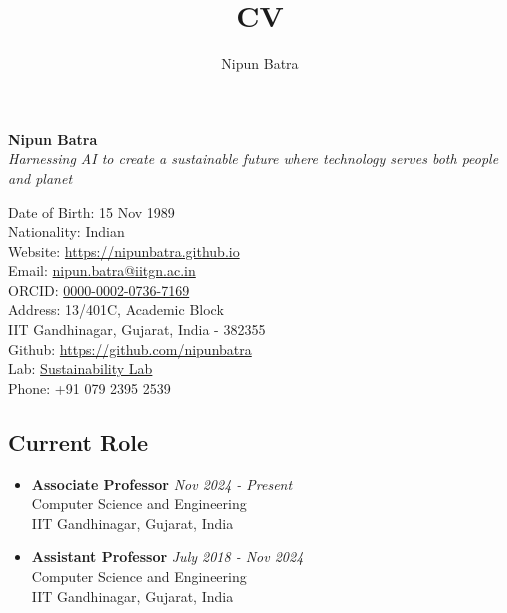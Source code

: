 \documentclass[letter,10pt]{article}
\title{CV}
\author{Nipun Batra}
\begin{document}
\setlength\itemsep{-0.5em}
\setlength\parskip{0.1em}
\renewcommand{\baselinestretch}{1.0}

\begin{center}
	{\Large\textbf{Nipun Batra}}\\[0.2em]
	\textit{Harnessing AI to create a sustainable future where technology serves both people and planet}
\end{center}
\vspace{0.3em}



\begin{multicols}{2}
\begin{small}
\noindent Date of Birth: 15 Nov 1989 \\
Nationality: Indian \\
Website: \href{https://nipunbatra.github.io}{https://nipunbatra.github.io} \\ 
Email: \href{mailto:nipun.batra@iitgn.ac.in}{nipun.batra@iitgn.ac.in} \\
ORCID: \href{https://orcid.org/0000-0002-0736-7169}{0000-0002-0736-7169} \\
Address: 13/401C, Academic Block\\
	IIT Gandhinagar,
	Gujarat, India - 382355\\
Github: \href{https://github.com/nipunbatra}{https://github.com/nipunbatra}\\
Lab: \href{https://sustainability-lab.github.io/}{Sustainability Lab} \\
Phone: +91 079 2395 2539
\end{small}
\end{multicols}

\subsection*{\textbf{Current Role}}
\vspace{-0.4em}
\begin{itemize}
\item[] 
    \textbf{Associate Professor} \hfill \textit{Nov 2024 - Present}\\
    Computer Science and Engineering \\
	IIT Gandhinagar, Gujarat, India
\item[] 
    \textbf{Assistant Professor} \hfill \textit{July 2018 - Nov 2024}\\
    Computer Science and Engineering \\
	IIT Gandhinagar, Gujarat, India
\end{itemize}
\end{document}
